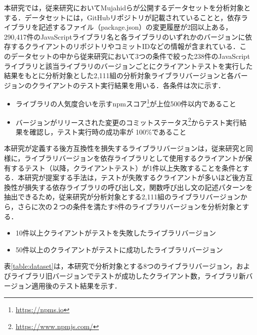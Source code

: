 \documentclass[T,J]{fose} %
\begin{document}
本研究では，従来研究においてMujahidらが公開するデータセットを分析対象とする．データセットには，GitHubリポジトリが記載されていることと，依存ライブラリを記述するファイル（package.json）の変更履歴が2回以上ある，290,417件のJavaScriptライブラリ名と各ライブラリのいずれかのバージョンに依存するクライアントのリポジトリやコミットIDなどの情報が含まれている．このデータセットの中から従来研究\cite{matsuda}において3つの条件で絞った238件のJavaScriptライブラリと該当ライブラリのバージョンごとにクライアントテストを実行した結果をもとに分析対象とした2,111組の分析対象ライブラリバージョンと各バージョンのクライアントのテスト実行結果を用いる．各条件は次に示す．
\begin{itemize}
\item ライブラリの人気度合いを示すnpmスコア\footnote{\url{https://npms.io}}が上位500件以内であること
\item バージョンがリリースされた変更のコミットステータス\footnote{\url{https://www.npmjs.com/}}からテスト実行結果を確認し，テスト実行時の成功率が 100\%であること
\end{itemize}





本研究が定義する後方互換性を損失するライブラリバージョンは，従来研究\cite{mujahid}と同様に，ライブラリバージョンを依存ライブラリとして使用するクライアントが保有するテスト（以降，クライアントテスト）が1件以上失敗することを条件とする．本研究が提案する手法は，テストが失敗するクライアントが多いほど後方互換性が損失する依存ライブラリの呼び出し文，関数呼び出し文の記述パターンを抽出できるため，従来研究\cite{matsuda}が分析対象とする2,111組のライブラリバージョンから，さらに次の２つの条件を満たす8件のライブラリバージョンを分析対象とする．
\begin{itemize}
\item 10件以上クライアントがテストを失敗したライブラリバージョン
\item 50件以上のクライアントがテストに成功したライブラリバージョン
\end{itemize}
表\ref{table:dataset}は，本研究で分析対象とする8つのライブラリバージョン，およびライブラリ旧バージョンでテストが成功したクライアント数，ライブラリ新バージョン適用後のテスト結果を示す．
\end{document}
